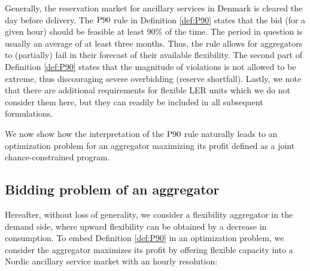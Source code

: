 \documentclass[conference]{IEEEtran}
\begin{document}
Generally, the reservation market for ancillary services in Denmark is cleared the day before delivery. The $\rm{P90}$ rule in Definition \ref{def:P90} states that the bid (for a given hour) should be feasible at least 90\% of the time. The period in question is usually an average of at least three months. Thus, the rule allows for aggregators to (partially) fail in their forecast of their available flexibility. The second part of Definition \ref{def:P90} states that the magnitude of violations is not allowed to be extreme, thus discouraging severe overbidding (reserve shortfall). Lastly, we note that there are additional requirements for flexible \ac{LER} units \cite{energinet} which we do not consider them here, but they can readily be included in all subsequent formulations.

We now show how the interpretation of the $\rm{P90}$ rule naturally leads to an optimization problem for an aggregator maximizing its profit defined as a joint chance-constrained program.

\vspace{1mm}
\subsection{Bidding problem of an aggregator}
\vspace{-1mm}
Hereafter, without loss of generality, we consider a flexibility aggregator in the demand side, where upward flexibility can be obtained by a decrease in consumption. To embed Definition \ref{def:P90} in an optimization problem, we consider the aggregator maximizes its profit by offering flexible capacity into a Nordic ancillary service market with an hourly resolution:
\end{document}
